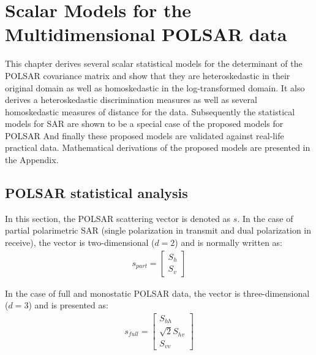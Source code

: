 \chapter{Scalar Models for the Multidimensional POLSAR data} %
\label{chap:polsar}

This chapter derives several scalar statistical models for the
                determinant of the POLSAR covariance matrix and
                show that they are heteroskedastic in their original
                domain as well as homoskedastic in the log-transformed
                domain.
It
                also derives a heteroskedastic discrimination measures
                 as well as several homoskedastic measures of
                distance for the data.
Subsequently the statistical models for SAR are shown to be a special case of
                the proposed models for POLSAR
And finally these proposed models are validated against real-life practical data.
Mathematical derivations of the proposed models are presented in the Appendix. %

\section{POLSAR statistical analysis}

In this section, the POLSAR scattering vector is denoted as $s$.
In the case of partial polarimetric SAR (single polarization in transmit and dual polarization in receive),
  the vector is two-dimensional ($d=2$) and is normally written as: 
\begin{align}  
s_{part}=\begin{bmatrix}
S_h\\ 
S_v
\end{bmatrix}
\end{align}

In the case of full and monostatic POLSAR data,
  the vector is three-dimensional ($d=3$) and is presented as:
\begin{align}
s_{full}=\begin{bmatrix}
S_{hh}\\
\sqrt{2}S_{hv}\\
S_{vv}
\end{bmatrix}
\end{align}

